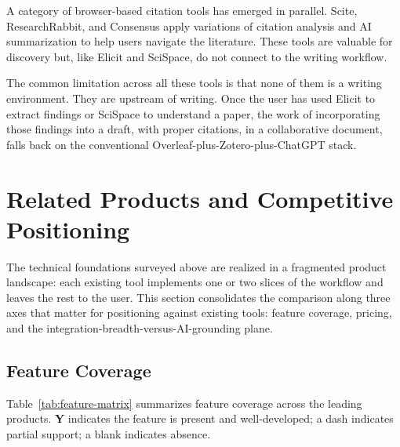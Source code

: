 A category of browser-based citation tools has emerged in parallel. Scite, ResearchRabbit, and Consensus apply variations of citation analysis and AI summarization to help users navigate the literature. These tools are valuable for discovery but, like Elicit and SciSpace, do not connect to the writing workflow.

The common limitation across all these tools is that none of them is a writing environment. They are upstream of writing. Once the user has used Elicit to extract findings or SciSpace to understand a paper, the work of incorporating those findings into a draft, with proper citations, in a collaborative document, falls back on the conventional Overleaf-plus-Zotero-plus-ChatGPT stack.

\section{Related Products and Competitive Positioning}
\label{sec:lit-products}

The technical foundations surveyed above are realized in a fragmented product landscape: each existing tool implements one or two slices of the workflow and leaves the rest to the user. This section consolidates the comparison along three axes that matter for positioning \sh{} against existing tools: feature coverage, pricing, and the integration-breadth-versus-AI-grounding plane.

\subsection{Feature Coverage}
\label{sec:lit-features}

Table~\ref{tab:feature-matrix} summarizes feature coverage across the leading products. \textbf{Y} indicates the feature is present and well-developed; a dash indicates partial support; a blank indicates absence.

